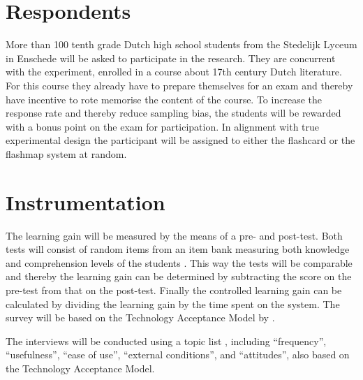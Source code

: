\section{Respondents}



More than 100 tenth grade Dutch high school students from the Stedelijk Lyceum in Enschede will be asked to participate in the research. They are concurrent with the experiment, enrolled in a course about 17th century Dutch literature. For this course they already have to prepare themselves for an exam and thereby have incentive to rote memorise the content of the course. To increase the response rate and thereby reduce sampling bias, the students will be rewarded with a bonus point on the exam for participation. In alignment with true experimental design the participant will be assigned to either the flashcard or the flashmap system at random.

\section{Instrumentation}



The learning gain will be measured by the means of a pre- and post-test. Both tests will consist of random items from an item bank measuring both knowledge and comprehension levels of the students \cite{bloom}. This way the tests will be comparable and thereby the learning gain can be determined by subtracting the score on the pre-test from that on the post-test. Finally the controlled learning gain can be calculated by dividing the learning gain by the time spent on the system. The survey will be based on the Technology Acceptance Model by . 

The interviews will be conducted using a topic list \cite{baarda}, including “frequency”, “usefulness”, “ease of use”, “external conditions”, and “attitudes”, also based on the Technology Acceptance Model. 

